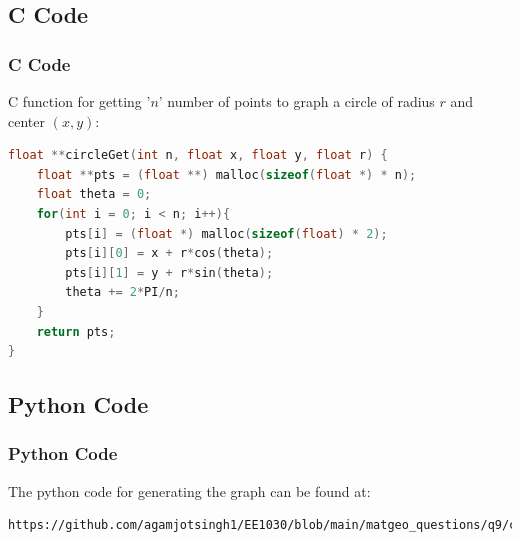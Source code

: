 \documentclass{beamer}
\providecommand{\brak}[1]{\ensuremath{\left(#1\right)}}
\theoremstyle{remark}
\numberwithin{equation}{section}
\begin{document}
\subsection{C Code}
\begin{frame}[fragile]
\frametitle{C Code}

C function for getting '$n$' number of points to graph a circle of radius $r$ and center $\brak{x, y}$:

\begin{lstlisting}[language=C]
float **circleGet(int n, float x, float y, float r) {
    float **pts = (float **) malloc(sizeof(float *) * n); 
    float theta = 0;
    for(int i = 0; i < n; i++){
        pts[i] = (float *) malloc(sizeof(float) * 2);
        pts[i][0] = x + r*cos(theta);
        pts[i][1] = y + r*sin(theta);
        theta += 2*PI/n;
    }
    return pts;
}
\end{lstlisting}

\end{frame}

\subsection{Python Code}
\begin{frame}[fragile]
\frametitle{Python Code}

The python code for generating the graph can be found at:
\begin{lstlisting}
https://github.com/agamjotsingh1/EE1030/blob/main/matgeo_questions/q9/codes/graph.py
\end{lstlisting}

\end{frame}
\end{document}
